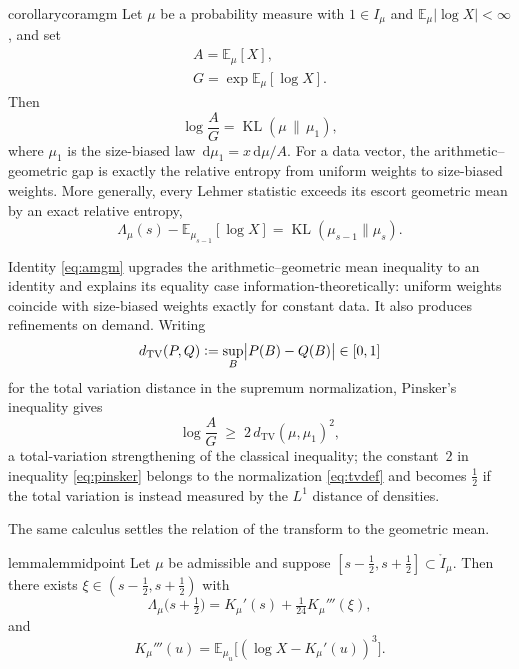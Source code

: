 \documentclass[sn-mathphys-num]{sn-jnl}
\theoremstyle{thmstyleone}%
\theoremstyle{thmstyletwo}%
\theoremstyle{thmstylethree}%
\theoremstyle{thmstyleone}%
\providecommand{\E}{\mathbb{E}}
\providecommand{\KL}{\operatorname{KL}}
\providecommand{\dd}{\,\mathrm{d}}
\providecommand{\eqdef}{\mathrel{\vcentcolon=}}
\begin{document}
	\begin{restatable}[AM--GM gap]{corollary}{coramgm}\label{cor:amgm}
		Let $\mu$ be a probability measure with $1\in I_\mu$ and
		$\E_\mu|\log X|<\infty$, and set
		\begin{equation}\label{eq:AGdef}
			\begin{gathered}
				A=\E_\mu[X],\\
				G=\exp\E_\mu[\log X].
			\end{gathered}
		\end{equation}
		Then
		\begin{equation}\label{eq:amgm}
			\log\frac AG=\KL(\mu\,\|\,\mu_1),
		\end{equation}
		where $\mu_1$ is the size-biased law $\dd\mu_1=x\dd\mu/A$. For a
		data vector, the arithmetic--geometric gap is exactly the relative
		entropy from uniform weights to size-biased weights. More
		generally, every Lehmer statistic exceeds its escort geometric
		mean by an exact relative entropy,
		\begin{equation}\label{eq:amgmgeneral}
			\Lambda_\mu(s)-\E_{\mu_{s-1}}[\log X]=\KL(\mu_{s-1}\|\mu_s).
		\end{equation}
	\end{restatable}
	
	
	Identity \eqref{eq:amgm} upgrades the arithmetic--geometric mean
	inequality to an identity and explains its equality case
	information-theoretically: uniform weights coincide with size-biased
	weights exactly for constant data. It also produces refinements on
	demand. Writing
	\begin{equation}\label{eq:tvdef}
		d_{\mathrm{TV}}(P,Q)\eqdef\sup_{B}\bigl|P(B)-Q(B)\bigr|\in[0,1]
	\end{equation}
	for the total variation distance in the supremum normalization,
	Pinsker's inequality gives
	\begin{equation}\label{eq:pinsker}
		\log\frac AG\;\ge\;2\,d_{\mathrm{TV}}(\mu,\mu_1)^{2},
	\end{equation}
	a total-variation strengthening of the classical inequality; the
	constant~$2$ in inequality \eqref{eq:pinsker} belongs to the
	normalization \eqref{eq:tvdef} and becomes $\tfrac12$ if the total
	variation is instead measured by the $L^1$ distance of densities.
	
	The same calculus settles the relation of the transform to the
	geometric mean.
	
	\begin{restatable}{lemma}{lemmidpoint}\label{lem:midpoint}
		Let $\mu$ be admissible and suppose
		$[s-\tfrac12,s+\tfrac12]\subset\mathring I_\mu$. Then there
		exists $\xi\in(s-\tfrac12,s+\tfrac12)$ with
		\begin{equation}\label{eq:midpoint}
			\Lambda_\mu\bigl(s+\tfrac12\bigr)
			=K_\mu'(s)+\tfrac1{24}K_\mu'''(\xi),
		\end{equation}
		and
		\begin{equation}\label{eq:thirdcentral}
			K_\mu'''(u)=\E_{\mu_u}\bigl[(\log X-K_\mu'(u))^3\bigr].
		\end{equation}
	\end{restatable}
	
\end{document}
